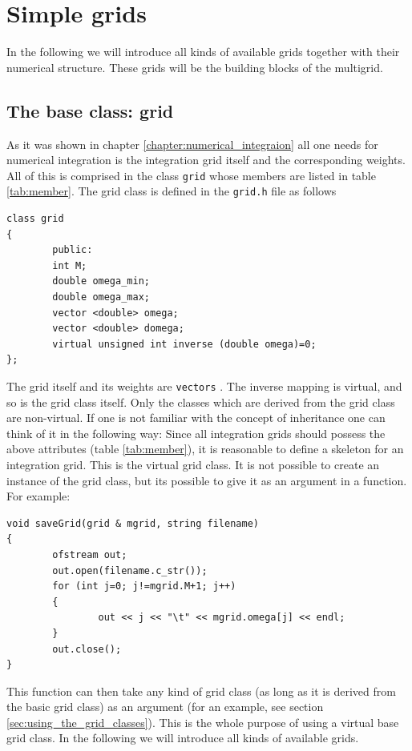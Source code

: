 \chapter{Simple grids} \label{chapter:simple_grids}
In the following we will introduce all kinds of available grids together with their numerical structure. These grids will be the building blocks of the multigrid.
\section{The base class: grid}
As it was shown in chapter \ref{chapter:numerical_integraion} all one needs for numerical integration is the integration grid itself and the corresponding weights. All of this is comprised in the class \texttt{grid} whose members are listed in table \ref{tab:member}. The grid class is defined in the \texttt{grid.h} file as follows

\begin{lstlisting}
class grid
{
        public:
        int M;
        double omega_min;
        double omega_max;
        vector <double> omega;
        vector <double> domega;
        virtual unsigned int inverse (double omega)=0;
};
\end{lstlisting}
The grid itself and its weights are \texttt{vectors} \cite{stl}. The inverse mapping is virtual, and so is the grid class itself. Only the classes which are derived from the grid class are non-virtual. If one is not familiar with the concept of inheritance one can think of it in the following way: Since all integration grids should possess the above attributes (table \ref{tab:member}), it is reasonable to define a skeleton for an integration grid. This is the virtual grid class. It is not possible to create an instance of the grid class, but its possible to give it as an argument in a function. For example:
\begin{lstlisting}
void saveGrid(grid & mgrid, string filename)
{
        ofstream out;
        out.open(filename.c_str());
        for (int j=0; j!=mgrid.M+1; j++)
        {
                out << j << "\t" << mgrid.omega[j] << endl;
        }
        out.close();
}
\end{lstlisting}
This function can then take any kind of grid class (as long as it is derived from the basic grid class) as an argument (for an example, see section \ref{sec:using_the_grid_classes}). This is the whole purpose of using a virtual base grid class. In the following we will introduce all kinds of available grids.

